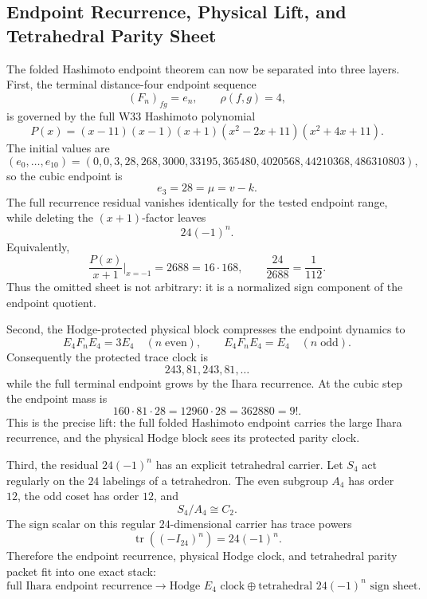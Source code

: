 \subsection{Endpoint Recurrence, Physical Lift, and Tetrahedral Parity Sheet}
\label{subsec:bt643-endpoint-physical-lift}

The folded Hashimoto endpoint theorem can now be separated into three layers.
First, the terminal distance-four endpoint sequence
\[
(F_n)_{fg}=e_n,\qquad \rho(f,g)=4,
\]
is governed by the full W33 Hashimoto polynomial
\[
P(x)=(x-11)(x-1)(x+1)(x^2-2x+11)(x^2+4x+11).
\]
The initial values are
\[
(e_0,\ldots,e_{10})=(0,0,3,28,268,3000,33195,365480,4020568,44210368,486310803),
\]
so the cubic endpoint is
\[
e_3=28=\mu=v-k.
\]
The full recurrence residual vanishes identically for the tested endpoint range,
while deleting the \((x+1)\)-factor leaves
\[
\boxed{24(-1)^n.}
\]
Equivalently,
\[
\frac{P(x)}{x+1}\bigg|_{x=-1}=2688=16\cdot168,
\qquad
\frac{24}{2688}=\frac1{112}.
\]
Thus the omitted sheet is not arbitrary: it is a normalized sign component of the
endpoint quotient.

Second, the Hodge-protected physical block compresses the endpoint dynamics to
\[
\boxed{
E_4F_nE_4=3E_4\quad(n\;\mathrm{even}),
\qquad
E_4F_nE_4=E_4\quad(n\;\mathrm{odd}).
}
\]
Consequently the protected trace clock is
\[
243,81,243,81,\ldots
\]
while the full terminal endpoint grows by the Ihara recurrence.  At the cubic
step the endpoint mass is
\[
\boxed{
160\cdot81\cdot28=12960\cdot28=362880=9!.
}
\]
This is the precise lift: the full folded Hashimoto endpoint carries the large
Ihara recurrence, and the physical Hodge block sees its protected parity clock.

Third, the residual \(24(-1)^n\) has an explicit tetrahedral carrier.  Let
\(S_4\) act regularly on the \(24\) labelings of a tetrahedron.  The even subgroup
\(A_4\) has order \(12\), the odd coset has order \(12\), and
\[
S_4/A_4\cong C_2.
\]
The sign scalar on this regular \(24\)-dimensional carrier has trace powers
\[
\boxed{
\operatorname{tr}((-I_{24})^n)=24(-1)^n.
}
\]
Therefore the endpoint recurrence, physical Hodge clock, and tetrahedral parity
packet fit into one exact stack:
\[
\boxed{
\text{full Ihara endpoint recurrence}
\longrightarrow
\text{Hodge }E_4\text{ clock}
\oplus
\text{tetrahedral }24(-1)^n\text{ sign sheet}.
}
\]
